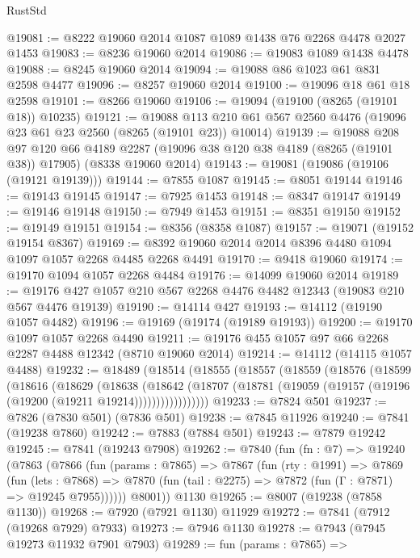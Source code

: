 \begin{lexlean}{RustStd}
\begin{coremodule}
{\begin{coremodule}
{{{{{{{{{{{{{{{{{{{{{{{{{{{{{{{{{{{{{{{{{{{{{{{{{{{{{{@19081 := @8222 @19060 @2014 @1087 @1089 @1438 @76 @2268 @4478 @2027 @1453
@19083 := @8236 @19060 @2014
@19086 := @19083 @1089 @1438 @4478
@19088 := @8245 @19060 @2014
@19094 := @19088 @86 @1023 @61 @831 @2598 @4477
@19096 := @8257 @19060 @2014
@19100 := @19096 @18 @61 @18 @2598
@19101 := @8266 @19060
@19106 := @19094 (@19100 (@8265 (@19101 @18)) @10235)
@19121 := @19088
    @113
    @210
    @61
    @567
    @2560
    @4476
    (@19096 @23 @61 @23 @2560 (@8265 (@19101 @23)) @10014)
@19139 := @19088
    @208
    @97
    @120
    @66
    @4189
    @2287
    (@19096 @38 @120 @38 @4189 (@8265 (@19101 @38)) @17905)
    (@8338 @19060 @2014)
@19143 := @19081 (@19086 (@19106 (@19121 @19139)))
@19144 := @7855 @1087
@19145 := @8051 @19144
@19146 := @19143 @19145
@19147 := @7925 @1453
@19148 := @8347 @19147
@19149 := @19146 @19148
@19150 := @7949 @1453
@19151 := @8351 @19150
@19152 := @19149 @19151
@19154 := @8356 (@8358 @1087)
@19157 := @19071 (@19152 @19154 @8367)
@19169 := @8392 @19060 @2014 @2014 @8396 @4480 @1094 @1097 @1057 @2268 @4485 @2268 @4491
@19170 := @9418 @19060
@19174 := @19170 @1094 @1057 @2268 @4484
@19176 := @14099 @19060 @2014
@19189 := @19176 @427 @1057 @210 @567 @2268 @4476 @4482 @12343 (@19083 @210 @567 @4476 @19139)
@19190 := @14114 @427
@19193 := @14112 (@19190 @1057 @4482)
@19196 := @19169 (@19174 (@19189 @19193))
@19200 := @19170 @1097 @1057 @2268 @4490
@19211 := @19176 @455 @1057 @97 @66 @2268 @2287 @4488 @12342 (@8710 @19060 @2014)
@19214 := @14112 (@14115 @1057 @4488)
@19232 := @18489
    (@18514
      (@18555
        (@18557
          (@18559
            (@18576
              (@18599
                (@18616
                  (@18629
                    (@18638
                      (@18642
                        (@18707
                          (@18781 (@19059 (@19157 (@19196 (@19200 (@19211 @19214)))))))))))))))))
@19233 := @7824 @501
@19237 := @7826 (@7830 @501) (@7836 @501)
@19238 := @7845 @11926
@19240 := @7841 (@19238 @7860)
@19242 := @7883 (@7884 @501)
@19243 := @7879 @19242
@19245 := @7841 (@19243 @7908)
@19262 := @7840
    (fun (fn : @7) =>
    @19240
      (@7863
        (@7866
          (fun (params : @7865) =>
          @7867
            (fun (rty : @1991) =>
            @7869
              (fun (lets : @7868) =>
              @7870 (fun (tail : @2275) => @7872 (fun (Γ : @7871) => @19245 @7955))))))
        @8001))
    @1130
@19265 := @8007 (@19238 (@7858 @1130))
@19268 := @7920 (@7921 @1130) @11929
@19272 := @7841 (@7912 (@19268 @7929) @7933)
@19273 := @7946 @1130
@19278 := @7943 (@7945 @19273 @11932 @7901 @7903)
@19289 := fun (params : @7865) =>
}}}}}}}}}}}}}}}}}}}}}}}}}}}}}}}}}}}}}}}}}}}}}}}}}}}}}}
\end{coremodule}}
\end{coremodule}
\end{lexlean}
